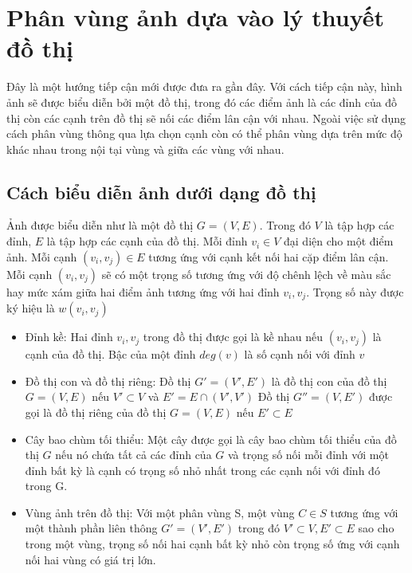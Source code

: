 \documentclass[12pt,oneside,a4]{report}
\begin{document}
\section{Phân vùng ảnh dựa vào lý thuyết đồ thị}
Đây là một hướng tiếp cận mới được đưa ra gần đây. Với cách tiếp cận này, hình ảnh sẽ được biểu diễn bởi một đồ thị, trong đó các điểm ảnh là các đỉnh của đồ thị còn các cạnh trên đồ thị sẽ nối các điểm lân cận với nhau. Ngoài việc sử dụng cách phân vùng thông qua lựa chọn cạnh còn có thể phân vùng dựa trên mức độ khác nhau trong nội tại vùng và giữa các vùng với nhau.
\subsection{Cách biểu diễn ảnh dưới dạng đồ thị}
Ảnh được biểu diễn như là một đồ thị $G=(V,E)$. Trong đó $V$ là tập hợp các đỉnh, $E$ là tập hợp các cạnh của đồ thị. Mỗi đỉnh $v_i\in V$ đại diện cho một điểm ảnh. Mỗi cạnh $(v_i,v_j)\in E$ tương ứng với cạnh kết nối hai cặp điểm lân cận. Mỗi cạnh $(v_i,v_j)$ sẽ có một trọng số tương ứng với độ chênh lệch về màu sắc hay mức xám giữa hai điểm ảnh tương ứng với hai đỉnh $v_i, v_j $. Trọng số này được ký hiệu là $w(v_i, v_j)$
\begin{itemize}
\item Đỉnh kề: Hai đỉnh $v_i, v_j$ trong đồ thị được gọi là kề nhau nếu $(v_i,v_j)$ là cạnh của đồ thị. Bậc của một đỉnh $deg(v)$ là số cạnh nối với đỉnh $v$
\item Đồ thị con và đồ thị riêng:
Đồ thị $G'=(V',E')$ là đồ thị con của đồ thị $G=(V,E)$ nếu $V' \subset V$ và $E'=E\cap (V',V')$ 
Đồ thị  $G''=(V,E')$ được gọi là đồ thị riêng của đồ thị $G=(V,E)$ nếu $E'\subset E$
\item Cây bao chùm tối thiểu: Một cây được gọi là cây bao chùm tối thiểu của đồ thị $G$  nếu nó chứa tất cả các đỉnh của $G$ và trọng số nối mỗi đỉnh với một đỉnh bất kỳ là cạnh có trọng số nhỏ nhất trong các cạnh nối với đỉnh đó trong G. 
\item Vùng ảnh trên đồ thị: Với một phân vùng S, một vùng $C\in S$ tương ứng với một thành phần liên thông $G'=(V', E')$ trong đó  $V'\subset V, E' \subset E$ sao cho trong một vùng, trọng số nối hai cạnh bất kỳ nhỏ còn trọng số ứng với cạnh nối hai vùng có giá trị lớn.
\end{itemize}
\end{document}
